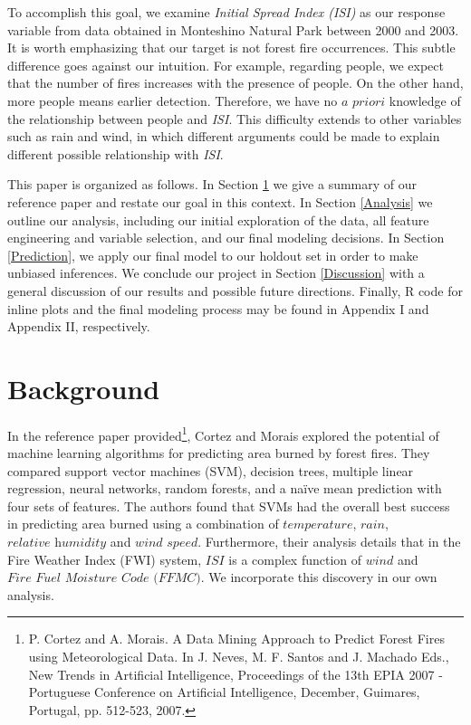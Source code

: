 \documentclass{article}
\begin{document}
To accomplish this goal, we examine \textit{Initial Spread Index (ISI)} as our response variable from data obtained in Monteshino Natural Park between 2000 and 2003. It is worth emphasizing that our target is not forest fire occurrences. This subtle difference goes against our intuition. For example, regarding people, we expect that the number of fires increases with the presence of people. On the other hand, more people means earlier detection. Therefore, we have no $\textit{a priori}$  knowledge of the relationship between people and \textit{ISI}. This difficulty extends to other variables such as rain and wind, in which different arguments could be made to explain different possible relationship with \textit{ISI}.

This paper is organized as follows. In Section \ref{Background} we give a summary of our reference paper and restate our goal in this context. In Section \ref{Analysis} we outline our analysis, including our initial exploration of the data, all feature engineering and variable selection, and our final modeling decisions. In Section \ref{Prediction}, we apply our final model to our holdout set in order to make unbiased inferences. We conclude our project in Section \ref{Discussion} with a general discussion of our results and possible future directions. Finally, R code for inline plots and the final modeling process may be found in Appendix I and Appendix II, respectively.

\section{Background}\label{Background}

In the reference paper provided\footnote{P. Cortez and A. Morais. A Data Mining Approach to Predict Forest Fires using Meteorological Data. In J. Neves, M. F. Santos and J. Machado Eds., New Trends in Artificial Intelligence, Proceedings of the 13th EPIA 2007 - Portuguese Conference on Artificial Intelligence, December, Guimares, Portugal, pp. 512-523, 2007.}, Cortez and Morais explored the potential of machine learning algorithms for predicting area burned by forest fires. They compared support vector machines (SVM), decision trees, multiple linear regression, neural networks, random forests, and a na\"ive mean prediction with four sets of features. The authors found that SVMs had the overall best success in predicting area burned using a combination of $\textit{temperature}$, $\textit{rain}$, $\textit{relative humidity}$ and $\textit{wind speed}$. Furthermore, their analysis details that in the Fire Weather Index (FWI) system, $\textit{ISI}$ is a complex function of $\textit{wind}$ and $\textit{Fire Fuel Moisture Code (FFMC)}$. We incorporate this discovery in our own analysis.
\end{document}
